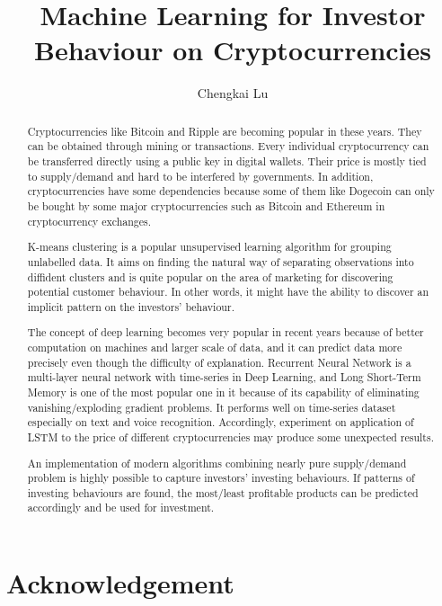 \documentclass[11pt]{article} %
\title{Machine Learning for Investor Behaviour on Cryptocurrencies}
\author{Chengkai Lu}
\theoremstyle{plain}
\theoremstyle{definition}
\begin{document}
\maketitle

\declaration

\begin{abstract}
Cryptocurrencies like Bitcoin and Ripple are becoming popular in these years. They can be obtained through mining or transactions. Every individual cryptocurrency can be transferred directly using a public key in digital wallets. Their price is mostly tied to supply/demand and hard to be interfered by governments. In addition, cryptocurrencies have some dependencies because some of them like Dogecoin can only be bought by some major cryptocurrencies such as Bitcoin and Ethereum in cryptocurrency exchanges.

K-means clustering is a popular unsupervised learning algorithm for grouping unlabelled data. It aims on finding the natural way of separating observations into diffident clusters and is quite popular on the area of marketing for discovering potential customer behaviour. In other words, it might have the ability to discover an implicit pattern on the investors' behaviour.

The concept of deep learning becomes very popular in recent years because of better computation on machines and larger scale of data, and it can predict data more precisely even though the difficulty of explanation. Recurrent Neural Network is a multi-layer neural network with time-series in Deep Learning, and Long Short-Term Memory is one of the most popular one in it because of its capability of eliminating vanishing/exploding gradient problems. It performs well on time-series dataset especially on text and voice recognition. Accordingly, experiment on application of LSTM to the price of different cryptocurrencies may produce some unexpected results.

An implementation of modern algorithms combining nearly pure supply/demand problem is highly possible to capture investors’ investing behaviours. If patterns of investing behaviours are found, the most/least profitable products can be predicted accordingly and be used for investment.
\end{abstract}

\listoffigures
\listoftables

\clearpage

\section*{\hfil Acknowledgement\hfil}
\end{document}

